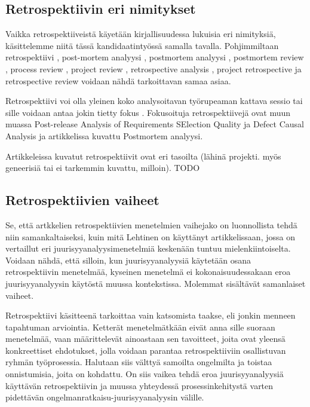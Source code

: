 \subsection{Retrospektiivin eri nimitykset}
Vaikka retrospektiiveistä käyetään kirjallisuudessa lukuisia eri nimityksiä, käsittelemme niitä tässä kandidaatintyössä samalla tavalla. Pohjimmiltaan retrospektiivi \citep{AgileRetros2006}, post-mortem analyysi \citep{staalhane2003post}, postmortem analyysi \citep{de2004learning}, postmortem review \citep{dingsoyr2003extending}, process review \citep{karlsson2006case}, project review \citep{karlsson2006case}, retrospective analysis \citep{karlsson2006case}, project retrospective \citep{karlsson2006case} ja retrospective review \citep{karlsson2006case} voidaan nähdä tarkoittavan samaa asiaa.

Retrospektiivi voi olla yleinen koko analysoitavan työrupeaman kattava sessio tai sille voidaan antaa jokin tietty fokus \citep{staalhane2003post}. Fokusoituja retrospektiivejä ovat muun muassa Post-release Analysis of Requirements SElection Quality \citep{karlsson2006case} ja Defect Causal Analysis \citep{card1998learning} ja artikkelissa \citep{de2004learning} kuvattu Postmortem analyysi.

Artikkeleissa kuvatut retrospektiivit ovat eri tasoilta (lähinä projekti. myös geneerisiä tai ei tarkemmin kuvattu, milloin). TODO

\subsection{Retrospektiivien vaiheet}
Se, että artkkelien retrospektiivien menetelmien vaihejako on luonnollista tehdä niin samankaltaiseksi, kuin mitä Lehtinen on käyttänyt artikkelissaan, jossa on vertaillut eri juurisyyanalyysimenetelmiä keskenään \citep{Lehtinen2011} tuntuu mielenkiintoiselta. Voidaan nähdä, että silloin, kun juurisyyanalyysiä käytetään osana retrospektiivin menetelmää, kyseinen menetelmä ei kokonaisuudessakaan eroa juurisyyanalyysin käytöstä muussa kontekstissa. Molemmat sisältävät samanlaiset vaiheet.

Retrospektiivi käsitteenä tarkoittaa vain katsomista taakse, eli jonkin menneen tapahtuman arviointia. Ketterät menetelmätkään eivät anna sille suoraan menetelmää, vaan määrittelevät ainoastaan sen tavoitteet, joita ovat yleensä konkreettiset ehdotukset, jolla voidaan parantaa retrospektiiviin osallistuvan ryhmän työprosessia. Halutaan siis välttyä samoilta ongelmilta ja toistaa onnistumisia, joita on kohdattu. On siis vaikea tehdä eroa juurisyyanalyysiä käyttävän retrospektiivin ja muussa yhteydessä prosessinkehitystä varten pidettävän ongelmanratkaisu-juurisyyanalyysin välille.

